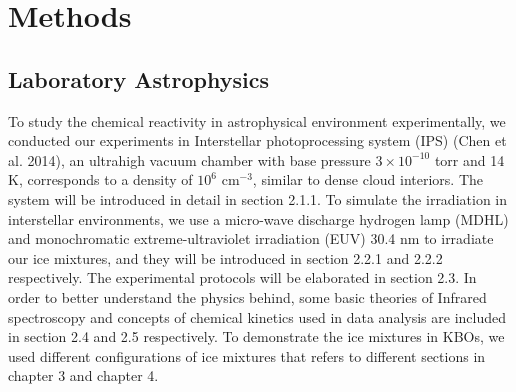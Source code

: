 \chapter{\protect Methods}

\section{Laboratory Astrophysics}
To study the chemical reactivity in astrophysical environment experimentally,
we conducted our experiments in Interstellar photoprocessing system (IPS) (Chen et al. 2014),
an ultrahigh vacuum chamber with base pressure $3 \times 10^{-10}$ torr and 14 K,
corresponds to a density of $10^6$ cm$^{-3}$, similar to dense cloud interiors.
The system will be introduced in detail in section 2.1.1.
To simulate the irradiation in interstellar environments,
we use a micro-wave discharge hydrogen lamp (MDHL) and monochromatic extreme-ultraviolet irradiation (EUV) 30.4 nm to irradiate our ice mixtures,
and they will be introduced in section 2.2.1 and 2.2.2 respectively.
The experimental protocols will be elaborated in section 2.3.
In order to better understand the physics behind, some basic theories of Infrared spectroscopy and concepts of chemical kinetics used in data analysis are included in section 2.4 and 2.5 respectively.
To demonstrate the ice mixtures in KBOs, we used different configurations of ice mixtures that refers to different sections in chapter 3 and chapter 4.\\
